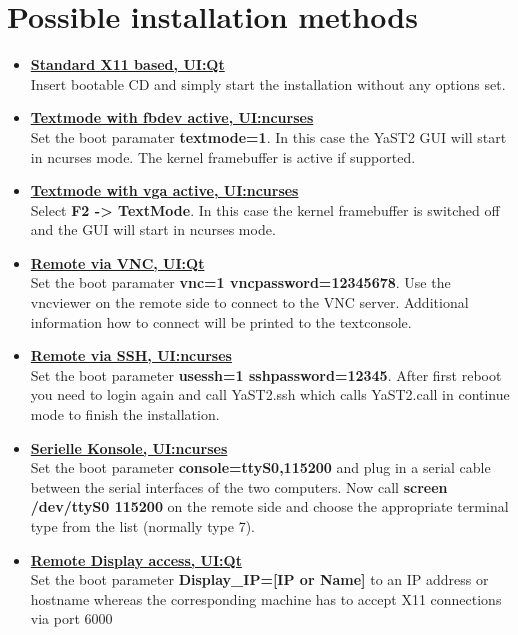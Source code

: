 \chapter{Possible installation methods}

\begin{itemize}
\item \textbf{\underline{Standard X11 based, UI:Qt}}\\
      Insert bootable CD and simply start the installation without
      any options set.
\item \textbf{\underline{Textmode with fbdev active, UI:ncurses}}\\
      Set the boot paramater \textbf{textmode=1}. In this case the
      YaST2 GUI will start in ncurses mode. The kernel framebuffer
      is active if supported.
\item \textbf{\underline{Textmode with vga active, UI:ncurses}}\\
      Select \textbf{F2 -> TextMode}. In this case the kernel framebuffer
      is switched off and the GUI will start in ncurses mode.
\item \textbf{\underline{Remote via VNC, UI:Qt}}\\
      Set the boot paramater \textbf{vnc=1 vncpassword=12345678}. Use
      the vncviewer on the remote side to connect to the VNC server.
      Additional information how to connect will be printed to the
      textconsole.
\item \textbf{\underline{Remote via SSH, UI:ncurses}}\\
      Set the boot parameter \textbf{usessh=1 sshpassword=12345}.
      After first reboot you need to login again and call
      YaST2.ssh which calls YaST2.call in continue mode to finish the
      installation.
\item \textbf{\underline{Serielle Konsole, UI:ncurses}}\\
      Set the boot parameter \textbf{console=ttyS0,115200} and plug in a
      serial cable between the serial interfaces of the two computers. Now
      call \textbf{screen /dev/ttyS0 115200} on the remote side and choose
      the appropriate terminal type from the list (normally type 7).
\item \textbf{\underline{Remote Display access, UI:Qt}}\\
      Set the boot parameter \textbf{Display\_IP=[IP or Name]} to an
      IP address or hostname whereas the corresponding machine has to accept
      X11 connections via port 6000
\end{itemize}
